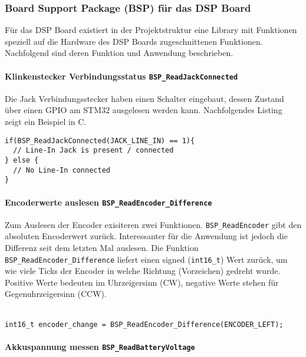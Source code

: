 \subsubsection{Board Support Package (BSP) für das DSP Board}
\label{sec:LibBSP}

Für das DSP Board existiert in der Projektstruktur eine Library mit Funktionen speziell auf die Hardware des DSP Boards zugeschnittenen Funktionen.
Nachfolgend sind deren Funktion und Anwendung beschrieben.


\paragraph{Klinkenstecker Verbindungsstatus \texttt{BSP\_ReadJackConnected}}

Die Jack Verbindungsstecker haben einen Schalter eingebaut, dessen Zustand über einen GPIO am STM32 ausgelesen werden kann.
Nachfolgendes Listing zeigt ein Beispiel in C.

\begin{lstlisting}[style=Cuvision,caption={Verbindungsstatus des Line-In auslesen}]
if(BSP_ReadJackConnected(JACK_LINE_IN) == 1){
  // Line-In Jack is present / connected
} else {
  // No Line-In connected
}
\end{lstlisting}


\paragraph{Encoderwerte auslesen \texttt{BSP\_ReadEncoder\_Difference}}

Zum Auslesen der Encoder exisiteren zwei Funktionen.
\texttt{BSP\_ReadEncoder} gibt den absoluten Encoderwert zurück.
Interessanter für die Anwendung ist jedoch die Differenz seit dem letzten Mal auslesen.
Die Funktion \texttt{BSP\_ReadEncoder\_Difference} liefert einen signed (\texttt{int16\_t}) Wert zurück, um wie viele Ticks der Encoder in welche Richtung (Vorzeichen) gedreht wurde.
Positive Werte bedeuten im Uhrzeigersinn (CW), negative Werte stehen für Gegenuhrzeigersinn (CCW). \\
 \\
 
\begin{lstlisting}[style=Cuvision,caption={Auslesen wie weit und in welche Richtung der linke Encoder gedreht wurde.}]
int16_t encoder_change = BSP_ReadEncoder_Difference(ENCODER_LEFT);
\end{lstlisting}


\paragraph{Akkuspannung messen \texttt{BSP\_ReadBatteryVoltage}}

